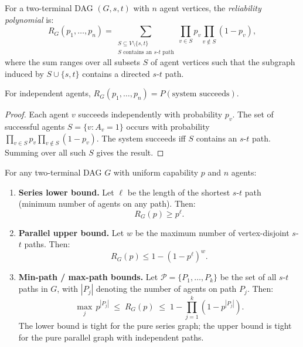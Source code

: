 \begin{definition}
\label{def:r4-reliability-poly}
For a two-terminal DAG $(G, s, t)$ with $n$ agent vertices, the \emph{reliability
polynomial} is:
\[
  R_G(p_1, \ldots, p_n) = \sum_{\substack{S \subseteq V \setminus \{s,t\} \\
  S \text{ contains an } s\text{-}t \text{ path}}}
  \prod_{v \in S} p_v \prod_{v \notin S} (1-p_v),
\]
where the sum ranges over all subsets $S$ of agent vertices such that the
subgraph induced by $S \cup \{s,t\}$ contains a directed $s$-$t$ path.
\end{definition}

\begin{theorem}
\label{thm:r4-reliability-poly-correct}
For independent agents, $R_G(p_1, \ldots, p_n) = P(\text{system succeeds})$.
\end{theorem}

\begin{proof}
Each agent $v$ succeeds independently with probability $p_v$.  The set of
successful agents $S = \{v : A_v = 1\}$ occurs with probability
$\prod_{v \in S} p_v \prod_{v \notin S}(1-p_v)$.  The system succeeds iff
$S$ contains an $s$-$t$ path.  Summing over all such $S$ gives the result.
\end{proof}

\begin{theorem}
\label{thm:r4-sp-bounds}
For any two-terminal DAG $G$ with uniform capability $p$ and $n$ agents:
\begin{enumerate}
  \item \textbf{Series lower bound.} Let $\ell$ be the length of the shortest
    $s$-$t$ path (minimum number of agents on any path).  Then:
    \[
      R_G(p) \ge p^\ell.
    \]
  \item \textbf{Parallel upper bound.} Let $w$ be the maximum number of
    vertex-disjoint $s$-$t$ paths.  Then:
    \[
      R_G(p) \le 1 - (1-p^\ell)^w.
    \]
  \item \textbf{Min-path / max-path bounds.} Let $\mathcal{P} = \{P_1, \ldots, P_k\}$
    be the set of all $s$-$t$ paths in $G$, with $|P_j|$ denoting the number of
    agents on path $P_j$.  Then:
    \[
      \max_j\, p^{|P_j|} \;\le\; R_G(p)
      \;\le\; 1 - \prod_{j=1}^k (1 - p^{|P_j|}).
    \]
    The lower bound is tight for the pure series graph; the upper bound is tight
    for the pure parallel graph with independent paths.
\end{enumerate}
\end{theorem}

